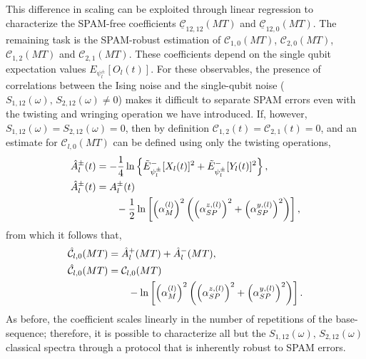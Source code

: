 \documentclass[%
 reprint,
superscriptaddress,
 amsmath,amssymb,
 aps,
pra,
floatfix,
]{revtex4-2}
\newcommand{\qk}[1]{{\color{OliveGreen}#1}}
\begin{document}
This difference in scaling can be exploited through linear regression to characterize the SPAM-free coefficients $\underline{\mathcal{C}}_{12,12}(MT)$ and $\underline{\mathcal{C}}_{12,0}(MT)$. The remaining task is the SPAM-robust estimation of $\mathcal{C}_{1,0}(MT)$, $\mathcal{C}_{2,0}(MT)$, $\mathcal{C}_{1,2}(MT)$ and $\mathcal{C}_{2,1}(MT)$. These coefficients depend on the single qubit expectation values $E_{\psi_l^\pm}[O_l(t)]$. For these observables, the presence of correlations between the Ising noise and the single-qubit noise ($S_{1,12}(\omega),\,S_{2,12}(\omega)\neq 0$) makes it difficult to separate SPAM errors even with the twisting and wringing operation we have introduced. If, however, $S_{1,12}(\omega)=S_{2,12}(\omega)= 0$, then by definition $\mathcal{C}_{1,2}(t)=\mathcal{C}_{2,1}(t)=0$, and an estimate for $\mathcal{C}_{l,0}(MT)$ can be defined using only the twisting operations,
\begin{align}
    \hat{A}_l^\pm(t)&=-\frac{1}{4}\ln\left\{\tilde{E}^-_{\psi_l^\pm}[X_l(t)]^2+\tilde{E}^-_{\psi_l^\pm}[Y_l(t)]^2\right\},\\
    \hat{A}_l^\pm(t)&=A^\pm_l(t)\notag\\
    &\qquad-\frac{1}{2}\ln\left[\left(\alpha_M^{(l)}\right)^2 \left(\left(\alpha_{SP}^{z,(l)}\right)^2+\left(\alpha_{SP}^{y,(l)}\right)^2\right)\right],
\end{align}
from which it follows that,
\begin{align}
    \hat{\mathcal{C}}_{l,0}(MT)&=\hat{A}^+_l(MT)+\hat{A}^-_l(MT),\\
    \hat{\mathcal{C}}_{l,0}(MT)&=\mathcal{C}_{l,0}(MT)\notag\\
    &\qquad-\ln\left[\left(\alpha_M^{(l)}\right)^2 \left(\left(\alpha_{SP}^{z,(l)}\right)^2+\left(\alpha_{SP}^{y,(l)}\right)^2\right)\right].
\end{align}
As before, the coefficient scales linearly in the number of repetitions of the base-sequence; therefore, it is possible to characterize all but the $S_{1,12}(\omega),\,S_{2,12}(\omega)$ classical spectra through a protocol that is inherently robust to SPAM errors.

\end{document}
